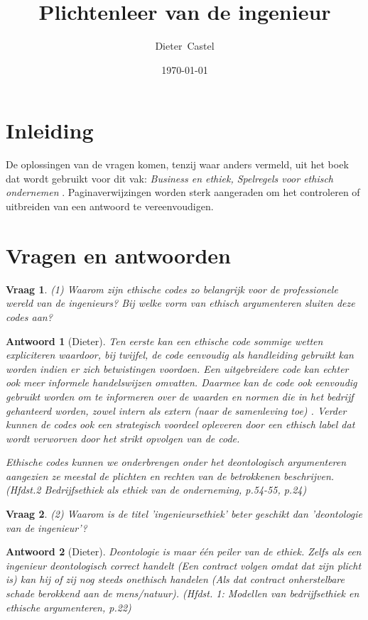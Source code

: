 \documentclass{article}
\title{Plichtenleer van de ingenieur}
\date{\today}
\author{Dieter~Castel}
\theoremstyle{nonumberplain}
\newtheorem{question}{Vraag}
\newtheorem{answer}{Antwoord}
\begin{document}
\maketitle
\tableofcontents
\newpage

\section{Inleiding}
De oplossingen van de vragen komen, tenzij waar anders vermeld, uit het boek dat wordt gebruikt voor dit vak: \textit{Business en ethiek, Spelregels voor ethisch ondernemen} \cite{gerwen2002business}. Paginaverwijzingen worden sterk aangeraden om het controleren of uitbreiden van een antwoord te vereenvoudigen.

\section{Vragen en antwoorden}

\begin{question}
(1)	Waarom zijn ethische codes zo belangrijk voor de professionele wereld van de ingenieurs? Bij welke vorm van ethisch argumenteren sluiten deze codes aan? 
\end{question}
\begin{answer}[Dieter]
	Ten eerste kan een ethische code sommige wetten expliciteren waardoor, bij twijfel, de code eenvoudig als handleiding gebruikt kan worden indien er zich betwistingen voordoen.
	Een uitgebreidere code kan echter ook meer informele handelswijzen omvatten.
	Daarmee kan de code ook eenvoudig gebruikt worden om te informeren over de waarden en normen die in het bedrijf gehanteerd worden, zowel intern als extern (naar de samenleving toe) .
	Verder kunnen de codes ook een strategisch voordeel opleveren door een ethisch label dat wordt verworven door het strikt opvolgen van de code.

	Ethische codes kunnen we onderbrengen onder het deontologisch argumenteren aangezien ze meestal de plichten en rechten van de betrokkenen beschrijven.
	\textit{(Hfdst.2 Bedrijfsethiek als ethiek van de onderneming, p.54-55, p.24)}
\end{answer}

\begin{question}
(2)	Waarom is de titel 'ingenieursethiek' beter geschikt dan 'deontologie van de ingenieur'?
\end{question}
\begin{answer}[Dieter]
	Deontologie is maar \'e\'en peiler van de ethiek. Zelfs als een ingenieur deontologisch correct handelt (Een contract volgen omdat dat zijn plicht is) kan hij of zij nog steeds onethisch handelen (Als dat contract onherstelbare schade berokkend aan de mens/natuur).
	\textit{(Hfdst. 1: Modellen van bedrijfsethiek en ethische argumenteren, p.22)}
\end{answer}
\end{document}
